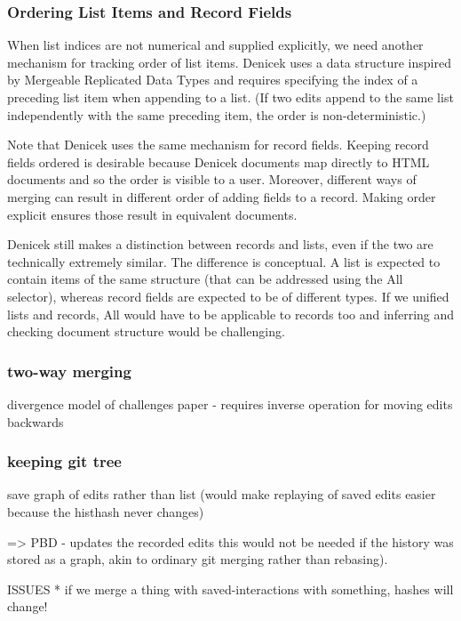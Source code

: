 \documentclass[sigconf,anonymous,screen]{acmart}
\newcommand{\ident}[1]{{\sffamily #1}}
\begin{document}
\subsubsection*{Ordering List Items and Record Fields}
When list indices are not numerical and supplied explicitly, we need another mechanism for
tracking order of list items. Denicek uses a data structure inspired by Mergeable Replicated
Data Types \cite{kaki-2019-mrdts} and requires specifying the index of a preceding list item
when appending to a list. (If two edits append to the same list independently with the same
preceding item, the order is non-deterministic.)

Note that Denicek uses the same mechanism for record fields. Keeping record fields ordered is
desirable because Denicek documents map directly to HTML documents and so the order is visible
to a user. Moreover, different ways of merging can result in different order of adding fields
to a record. Making order explicit ensures those result in equivalent documents.

Denicek still makes a distinction between records and lists, even if the two are technically
extremely similar. The difference is conceptual. A list is expected to contain items of the
same structure (that can be addressed using the \ident{All} selector), whereas record fields
are expected to be of different types. If we unified lists and records, \ident{All} would have
to be applicable to records too and inferring and checking document structure would be
challenging.

\subsubsection*{two-way merging}
divergence model of challenges paper - requires inverse operation for moving edits backwards

\subsubsection*{keeping git tree}

save graph of edits rather than list
(would make replaying of saved edits easier because the histhash never changes)

=> PBD - updates the recorded edits this would not be needed if the
history was stored as a graph, akin to ordinary git merging rather than rebasing).


ISSUES
* if we merge a thing with saved-interactions with something, hashes will change!
\end{document}

